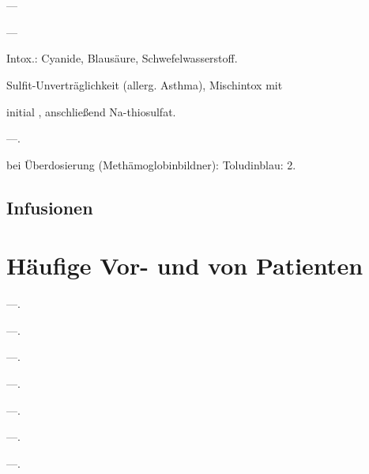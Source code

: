\section{}


{
\begin{MedikamentCharakteristika}
  \item[{\TxItemSpezialitaeten}] ---
  \item[Beschreibung] ---
  \item[{\TxItemIndikation}]  Intox.: Cyanide, Blausäure,
Schwefelwasserstoff.
  \item[{\TxItemKontraindikation}] Sulfit-Unverträglichkeit (allerg. 
  Asthma), Mischintox mit 
  \item[{\TxItemDosierung}] initial \MgKg*, anschließend
  \Mg* Na-thiosulfat.
  \item[{\TxItemCave}] ---.
  \item[Anm] bei Überdosierung (Methämoglobinbildner): Toludinblau: 
  2\MgKg.
\end{MedikamentCharakteristika}}
{}


\clearpage
\subsection{Infusionen}


\section{Häufige Vor- und  
von Patienten}




\begin{MedikamentCharakteristika}
  \item[{\TxItemSpezialitaeten}] ---.
  \item[Beschreibung] ---.
  \item[{\TxItemIndikation}] ---.
  \item[{\TxItemKontraindikation}] ---.
  \item[{\TxItemDosierung}] ---.
  \item[{\TxItemCave}] ---.
  \item[{\TxItemAnmerkung}] ---.
\end{MedikamentCharakteristika}

\ChapterEnd
